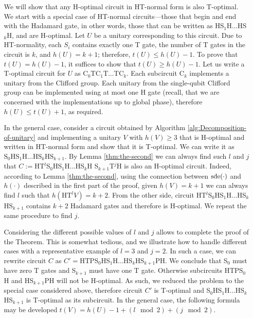 \documentclass[english,journal]{extarticle}
\makeatletter
\theoremstyle{plain}
\theoremstyle{plain}
\theoremstyle{plain}
\theoremstyle{definition}
\theoremstyle{plain}
\newenvironment{proof}[1][\proofname]{\par
     \normalfont\topsep6\p@\@plus6\p@\relax
     \trivlist
     \itemindent\parindent
     \item[\hskip\labelsep
           \scshape
       #1]\ignorespaces
   }{%
     \endtrivlist\@endpefalse
   }
\providecommand{\proofname}{Proof}
\theoremstyle{plain}
\makeatother
\begin{document}
\begin{proof}
We will show that any H-optimal circuit in HT-normal form is also T-optimal. We start with a special case of 
HT-normal circuits---those that begin and end with the Hadamard gate, in other words, those that can be written as HS$_1$H$\ldots$HS$_k$H, and are H-optimal. Let $U$ be a unitary corresponding
to this circuit. Due to HT-normality, each $S_i$ contains exactly one T gate, the number of T gates in the circuit is $k$, and $h(U)=k+1$; therefore, $t(U)\le h(U)-1$. To prove that
$t(U) = h(U)-1$, it suffices to show that $t(U) \ge h(U)-1$. Let us write a T-optimal circuit 
for $U$ as C$_0$TC$_1$T$\ldots$TC$_k$. Each subcircuit C$_k$ implements a unitary 
from the Clifford group. Each unitary from the single-qubit Clifford group can be implemented using 
at most one H gate (recall, that we are concerned with the implementations up to global phase), therefore $ h(U) \le t(U)+1$, as required. 

In the general case, consider a circuit obtained by Algorithm \ref{alg:Decomposition-of-unitary} and implementing a unitary $V$ with $h(V)\ge3$ that is H-optimal 
and written in HT-normal form and show that it is T-optimal. We
can write it as $\mathrm{S}_0\mathrm{HS}_1\mathrm{H}\ldots \mathrm{HS}_k \mathrm{HS}_{k+1}$.
By Lemma \ref{thm:the-second} we can always find such $l$ and $j$ that 
$C:=$HT$^l$S$_0$HS$_1$H$\ldots$HS$_k$H S$_{k+1}$T$^j$H is also an H-optimal circuit. Indeed,
according to Lemma \ref{thm:the-second}, using the connection between $\mathrm{sde}(\cdot)$ and $h(\cdot)$ described in the first part of the proof, given $h(V)=k+1$ we can always find $l$ such that $h(\mathrm{HT}^l V)=k+2$. From the other side, 
circuit HT$^l$S$_0$HS$_1$H$\ldots$HS$_k$HS$_{k+1}$ contains $k+2$ Hadamard gates and therefore is
H-optimal. We repeat the same procedure to find $j$. 

Considering the different possible values of $l$ and $j$ allows to complete the proof of the Theorem.  This is somewhat tedious, and we illustrate how to handle different cases 
with a representative example of $l=3$ and $j=2$. In such a case, we can rewrite circuit $C$ as $C'=$HTPS$_0$HS$_1$H$\ldots$HS$_k$HS$_{k+1}$PH. We conclude 
that S$_0$ must have zero T gates and S$_{k+1}$ must have one T gate. Otherwise subcircuits HTPS$_0$H and 
HS$_{k+1}$PH will not be H-optimal. As such, we reduced the problem to the special case considered above, therefore circuit $C'$ is T-optimal and S$_0$HS$_1$H$\ldots$HS$_k$HS$_{k+1}$ is T-optimal as its subcircuit. In the general case, the following formula may be developed $t\left(V\right) = h(U) - 1 + (l \mod 2) + (j \mod 2)$.
\end{proof}
\end{document}
